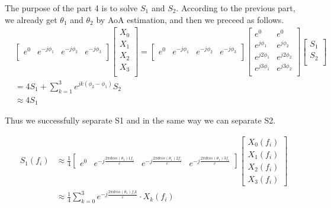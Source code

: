 \documentclass{article}
\begin{document}
        The purpose of the part 4 is to solve $S_1$ and $S_2$. According to the previous part, we already get $\theta_1$ and $\theta_2$ by AoA estimation, and then we preceed as follows.
        $$
        \begin{aligned}
        &\left[\begin{matrix}e^0&e^{-j\phi_1}&e^{-j\phi_2}&e^{-j\phi_3}\\\end{matrix}\right]
        \left[\begin{matrix}X_0\\X_1\\X_2\\X_3\\\end{matrix}\right]
        =
        \left[\begin{matrix}e^0&e^{-j\phi_1}&e^{-j\phi_2}&e^{-j\phi_3}\\\end{matrix}\right]
        \left[\begin{matrix}e^0&e^0\\e^{j\phi_1}&e^{j\phi_2}\\e^{j{2\phi}_1}&e^{j{2\phi}_2}\\e^{j{3\phi}_1}&e^{j{3\phi}_2}\\\end{matrix}\right]
        \left[\begin{matrix}S_1\\S_2\\\end{matrix}\right]\\
        &=4S_1 + \sum_{k=1}^{3} e^{j k\left(\phi_{2}-\phi_{1}\right)} S_{2}\\
        &\approx  4S_1
        \end{aligned}
        $$

        Thus we successfully separate S1 and in the same way we can separate S2.

        $$\begin{aligned}
        S_1(f_i) & \approx  \frac{1}{4} \left[\begin{matrix}e^0 & e^{-j\frac{2\pi d cos(\theta_1)1f_i}{c}}& e^{-j\frac{2\pi d cos(\theta_1)2f_i}{c}}& e^{-j\frac{2\pi d cos(\theta_1)3f_i}{c}}
        \end{matrix}\right] \left[\begin{matrix}
            X_0(f_i) \\
            X_1(f_i) \\
            X_2(f_i) \\
            X_3(f_i) 
        \end{matrix}\right]\\
        & \approx   \frac{1}{4} \sum_{k=0}^{3}e^{-j\frac{2\pi d cos(\theta_1)f_ik}{c}}\cdot X_k(f_i)
        \end{aligned}$$
\end{document}

